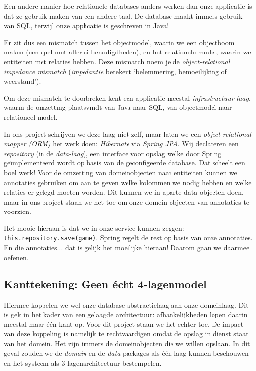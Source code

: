 \documentclass[dutch,a4paper,12pt,doubleside]{book}
\begin{document}
Een andere manier hoe relationele databases anders werken dan onze applicatie is dat 
ze gebruik maken van een andere taal. De database maakt immers gebruik van SQL, terwijl 
onze applicatie is geschreven in Java!

Er zit dus een mismatch tussen het objectmodel, 
waarin we een objectboom maken (een spel met allerlei benodigdheden),
en het relationele model, waarin we entiteiten met relaties hebben.
Deze mismatch noem je de \textit{object-relational impedance mismatch}
(\textit{impedantie} betekent `belemmering, bemoeilijking of weerstand').

Om deze mismatch te doorbreken kent een applicatie meestal
\textit{infrastructuur-laag}, 
waarin de omzetting plaatsvindt van Java naar SQL, 
van objectmodel naar relationeel model.

In ons project schrijven we deze laag niet zelf, maar laten we 
een \textit{object-relational mapper (ORM)} het werk doen: 
\textit{Hibernate} via \textit{Spring JPA}.
Wij declareren een \textit{repository} 
(in de \textit{data-laag}), 
een interface voor opslag welke door Spring geïmplementeerd wordt
op basis van de geconfigeerde database. Dat scheelt een boel werk!
Voor de omzetting van domeinobjecten naar entiteiten kunnen 
we annotaties gebruiken om aan te geven welke kolommen we nodig hebben en welke relaties er 
gelegd moeten worden. Dit kunnen we in aparte data-objecten doen, maar
in ons project staan we het toe om onze domein-objecten van annotaties te voorzien.

Het mooie hieraan is dat we in onze service kunnen zeggen:
\texttt{this.repository.save(game)}. Spring regelt de rest op 
basis van onze annotaties. En die annotaties... dat is gelijk 
het moeilijke hieraan! Daarom gaan we daarmee oefenen.

\newpage
\subsection{Kanttekening: Geen écht 4-lagenmodel}
Hiermee koppelen we wel onze database-abstractielaag aan onze domeinlaag. Dit is 
gek in het kader van een gelaagde architectuur: afhankelijkheden lopen daarin 
meestal maar één kant op. Voor dit project staan we het echter toe.
De impact van deze koppeling is namelijk te rechtvaardigen omdat de opslag 
in dienst staat van het domein. Het zijn immers de domeinobjecten die we 
willen opslaan. In dit geval zouden we de \textit{domain} en de \textit{data}
packages als één laag kunnen beschouwen en het systeem als 3-lagenarchitectuur
bestempelen.
\end{document}
